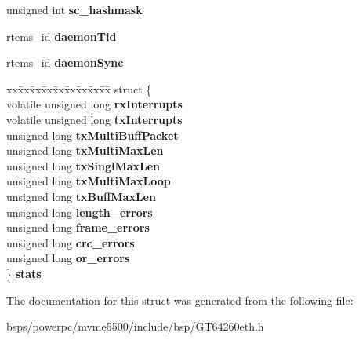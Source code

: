 \begin{DoxyCompactItemize}
\item 
\mbox{\label{structGTeth__softc_afde685783100462df7fabec298fce8d9}} 
unsigned int {\bfseries sc\+\_\+hashmask}
\item 
\mbox{\label{structGTeth__softc_a966ff9b362530981410b788d68f77f19}} 
\mbox{\hyperlink{group__ClassicTasks_gab20892b814dced7dd4e5b9bf42becd57}{rtems\+\_\+id}} {\bfseries daemon\+Tid}
\item 
\mbox{\label{structGTeth__softc_a8d2186df5b48f7bdf75d0f7b8c7b8a6b}} 
\mbox{\hyperlink{group__ClassicTasks_gab20892b814dced7dd4e5b9bf42becd57}{rtems\+\_\+id}} {\bfseries daemon\+Sync}
\item 
\mbox{\label{structGTeth__softc_a5a9858e82f8468b417872acababca945}} 
\begin{tabbing}
xx\=xx\=xx\=xx\=xx\=xx\=xx\=xx\=xx\=\kill
struct \{\\
\>volatile unsigned long {\bfseries rxInterrupts}\\
\>volatile unsigned long {\bfseries txInterrupts}\\
\>unsigned long {\bfseries txMultiBuffPacket}\\
\>unsigned long {\bfseries txMultiMaxLen}\\
\>unsigned long {\bfseries txSinglMaxLen}\\
\>unsigned long {\bfseries txMultiMaxLoop}\\
\>unsigned long {\bfseries txBuffMaxLen}\\
\>unsigned long {\bfseries length\_errors}\\
\>unsigned long {\bfseries frame\_errors}\\
\>unsigned long {\bfseries crc\_errors}\\
\>unsigned long {\bfseries or\_errors}\\
\} {\bfseries stats}\\

\end{tabbing}\end{DoxyCompactItemize}


The documentation for this struct was generated from the following file\+:\begin{DoxyCompactItemize}
\item 
bsps/powerpc/mvme5500/include/bsp/G\+T64260eth.\+h\end{DoxyCompactItemize}
